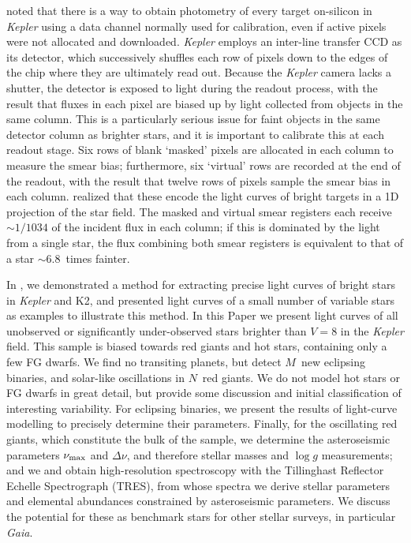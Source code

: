 \documentclass[a4paper,fleqn,usenatbib]{mnras}
\newcommand{\numax}{\mbox{$\nu_{\rm max}$}\xspace}
\newcommand{\Dnu}{\mbox{$\Delta \nu$}\xspace}
\newcommand{\logg}{\mbox{$\log g$}\xspace}
\newcommand{\kepler}{\emph{Kepler}\xspace}
\newcommand{\gaia}{\emph{Gaia}\xspace}
\begin{document}
\citet{orig_smear} noted that there is a way to obtain photometry of every target on-silicon in \kepler using a data channel normally used for calibration, even if active pixels were not allocated and downloaded. \kepler employs an inter-line transfer CCD as its detector, which successively shuffles each row of pixels down to the edges of the chip where they are ultimately read out. Because the \kepler camera lacks a shutter, the detector is exposed to light during the readout process, with the result that fluxes in each pixel are biased up by light collected from objects in the same column. This is a particularly serious issue for faint objects in the same detector column as brighter stars, and it is important to calibrate this at each readout stage. Six rows of blank `masked' pixels are allocated in each column to measure the smear bias; furthermore, six `virtual' rows are recorded at the end of the readout, with the result that twelve rows of pixels sample the smear bias in each column. \citet{orig_smear} realized that these encode the light curves of bright targets in a 1D projection of the star field. The masked and virtual smear registers each receive $\sim 1/1034$ of the incident flux in each column; if this is dominated by the light from a single star, the flux combining both smear registers is equivalent to that of a star $\sim 6.8$~times fainter. 

In \citet{smear}, we demonstrated a method for extracting precise light curves of bright stars in \kepler and K2, and presented light curves of a small number of variable stars as examples to illustrate this method. In this Paper we present light curves of all unobserved or significantly under-observed stars brighter than $V=8$ in the \kepler field. This sample is biased towards red giants and hot stars, containing only a few FG dwarfs. We find no transiting planets, but detect $M$~new eclipsing binaries, and solar-like oscillations in $N$~red giants. We do not model hot stars or FG dwarfs in great detail, but provide some discussion and initial classification of interesting variability. For eclipsing binaries, we present the results of light-curve modelling to precisely determine their parameters. Finally, for the oscillating red giants, which constitute the bulk of the sample, we determine the asteroseismic parameters \numax and \Dnu, and therefore stellar masses and \logg measurements; and we and obtain high-resolution spectroscopy with the Tillinghast Reflector Echelle Spectrograph (TRES), from whose spectra we derive stellar parameters and elemental abundances constrained by asteroseismic parameters. We discuss the potential for these as benchmark stars for other stellar surveys, in particular \gaia. 
\end{document}
